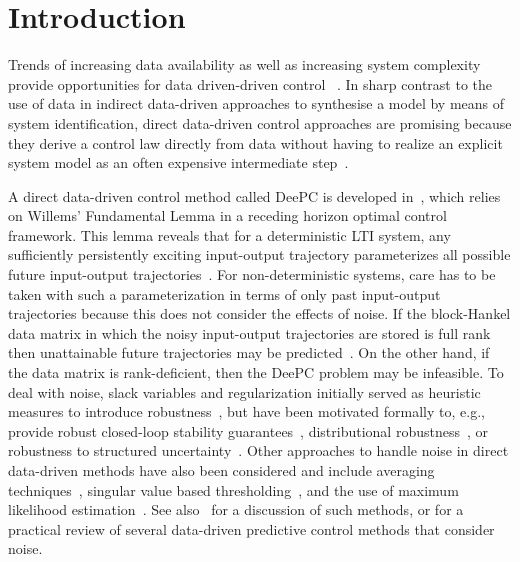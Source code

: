 \section{Introduction}
Trends of increasing data availability as well as increasing system complexity provide opportunities for data driven-driven control%
~\citep{Hou2013}. In sharp contrast to the use of data in %
indirect data-driven approaches to synthesise a model by means of system identification, direct data-driven control approaches are promising because they derive a control law directly from data without having to realize an explicit system model as an often expensive intermediate step~\citep{Hjalmarsson2005}.

A direct data-driven control method called \ac{DeePC} is developed in~\cite{Coulson2019}, which relies on Willems' Fundamental Lemma in a receding horizon optimal control framework. This lemma reveals that for a deterministic \ac{LTI} system, any sufficiently persistently exciting input-output trajectory parameterizes all possible future input-output trajectories~\citep{Willems2005}. %
% 
For non-deterministic systems, care has to be taken with such a parameterization in terms of only past input-output trajectories because this does not consider the effects of noise. If the block-Hankel data matrix in which the noisy input-output trajectories are stored is full rank then unattainable future trajectories may be predicted~\citep{Markovsky2022}. On the other hand, if the data matrix is rank-deficient, then the \ac{DeePC} problem may be infeasible. To deal with noise, slack variables and regularization initially served as heuristic measures to introduce robustness~\citep{Coulson2019}, but have been motivated formally to, e.g., provide robust closed-loop stability guarantees~\citep{Berberich2021}, distributional robustness~\citep{Coulson2019a}, or robustness to structured uncertainty~\citep{Huang2023}. Other approaches to handle noise in direct data-driven methods have also been considered and include averaging techniques~\citep{Jo2022}, singular value based thresholding~\citep{Sassella2022}, and the use of maximum likelihood estimation~\citep{Yin2023}. See also~\cite{Sassella2023} for a discussion of such methods, or \citep{Verheijen2023} for a practical review of several data-driven predictive control methods that consider noise.

